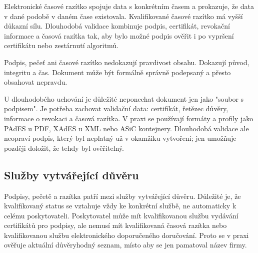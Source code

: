 Elektronické časové razítko spojuje data s konkrétním časem a prokazuje, že data v dané podobě v daném čase existovala. Kvalifikované časové razítko má vyšší důkazní sílu. Dlouhodobá validace kombinuje podpis, certifikát, revokační informace a časová razítka tak, aby bylo možné podpis ověřit i po vypršení certifikátu nebo zestárnutí algoritmů.

Podpis, pečeť ani časové razítko nedokazují pravdivost obsahu. Dokazují původ, integritu a čas. Dokument může být formálně správně podepsaný a přesto obsahovat nepravdu.

U dlouhodobého uchování je důležité neponechat dokument jen jako "soubor s podpisem". Je potřeba zachovat validační data: certifikát, řetězec důvěry, informace o revokaci a časová razítka. V praxi se používají formáty a profily jako PAdES u PDF, XAdES u XML nebo ASiC kontejnery. Dlouhodobá validace ale neopraví podpis, který byl neplatný už v okamžiku vytvoření; jen umožňuje později doložit, že tehdy byl ověřitelný.



\subsection*{Služby vytvářející důvěru}
Podpisy, pečetě a razítka patří mezi služby vytvářející důvěru. Důležité je, že kvalifikovaný status se vztahuje vždy ke konkrétní službě, ne automaticky k celému poskytovateli. Poskytovatel může mít kvalifikovanou službu vydávání certifikátů pro podpisy, ale nemusí mít kvalifikovaná časová razítka nebo kvalifikovanou službu elektronického doporučeného doručování. Proto se v praxi ověřuje aktuální důvěryhodný seznam, místo aby se jen pamatoval název firmy.

